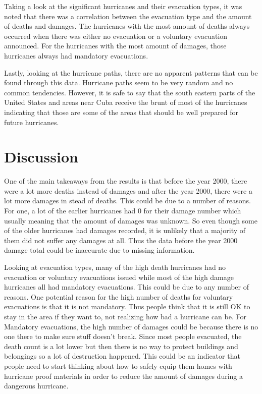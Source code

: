\deathsDamagesTable

Taking a look at the significant hurricanes and their evacuation types, it was noted that there was a correlation between the evacuation type and the amount of deaths and damages. The hurricanes with the most amount of deaths always occurred when there was either no evacuation or a voluntary evacuation announced. For the hurricanes with the most amount of damages, those hurricanes always had mandatory evacuations.

\evacuationTable

Lastly, looking at the hurricane paths, there are no apparent patterns that can be found through this data. Hurricane paths seem to be very random and no common tendencies. However, it is safe to say that the south eastern parts of the United States and areas near Cuba receive the brunt of most of the hurricanes indicating that those are some of the areas that should be well prepared for future hurricanes.

\section{Discussion}

One of the main takeaways from the results is that before the year 2000, there were a lot more deaths instead of damages and after the year 2000, there were a lot more damages in stead of deaths. This could be due to a number of reasons. For one, a lot of the earlier hurricanes had 0 for their damage number which usually meaning that the amount of damages was unknown. So even though some of the older hurricanes had damages recorded, it is unlikely that a majority of them did not suffer any damages at all. Thus the data before the year 2000 damage total could be inaccurate due to missing information.

Looking at evacuation types, many of the high death hurricanes had no evacuation or voluntary evacuations issued while most of the high damage hurricanes all had mandatory evacuations. This could be due to any number of reasons. One potential reason for the high number of deaths for voluntary evacuations is that it is not mandatory. Thus people think that it is still OK to stay in the area if they want to, not realizing how bad a hurricane can be. For Mandatory evacuations, the high number of damages could be because there is no one there to make sure stuff doesn't break. Since most people evacuated, the death count is a lot lower but then there is no way to protect buildings and belongings so a lot of destruction happened. This could be an indicator that people need to start thinking about how to safely equip them homes with hurricane proof materials in order to reduce the amount of damages during a dangerous hurricane. 

